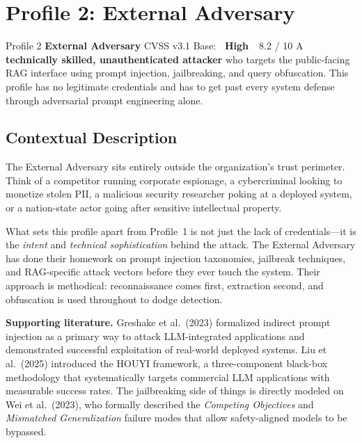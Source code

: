 \documentclass[a4paper,12pt]{report}
\newcommand{\badgehigh}{%
  \colorbox{warn}{\color{white}\small\textbf{~High~}}}
\begin{document}
\newpage
\section{Profile 2: External Adversary}

\begin{profilebanner}%
  {Profile 2 \enspace\textbf{External Adversary}}%
  {CVSS v3.1 Base: \badgehigh\ 8.2 / 10}
  \small
  A \textbf{technically skilled, unauthenticated attacker} who targets the
  public-facing RAG interface using prompt injection, jailbreaking, and query
  obfuscation. This profile has no legitimate credentials and has to get past
  every system defense through adversarial prompt engineering alone.
\end{profilebanner}

\subsection{Contextual Description}

\begin{prosebox}
The External Adversary sits entirely outside the organization's trust
perimeter. Think of a competitor running corporate espionage, a cybercriminal
looking to monetize stolen PII, a malicious security researcher poking at a
deployed system, or a nation-state actor going after sensitive intellectual
property.

What sets this profile apart from Profile~1 is not just the lack of
credentials---it is the \emph{intent} and \emph{technical sophistication}
behind the attack. The External Adversary has done their homework on prompt
injection taxonomies, jailbreak techniques, and RAG-specific attack vectors
before they ever touch the system. Their approach is methodical:
reconnaissance comes first, extraction second, and obfuscation is used
throughout to dodge detection.

\medskip
\textbf{Supporting literature.}
Greshake et al.\ (2023) formalized indirect prompt injection as a primary way
to attack LLM-integrated applications and demonstrated successful exploitation
of real-world deployed systems. Liu et al.\ (2025) introduced the HOUYI
framework, a three-component black-box methodology that systematically
targets commercial LLM applications with measurable success rates. The
jailbreaking side of things is directly modeled on Wei et al.\ (2023),
who formally described the \emph{Competing Objectives} and
\emph{Mismatched Generalization} failure modes that allow safety-aligned
models to be bypassed.
\end{prosebox}
\end{document}
